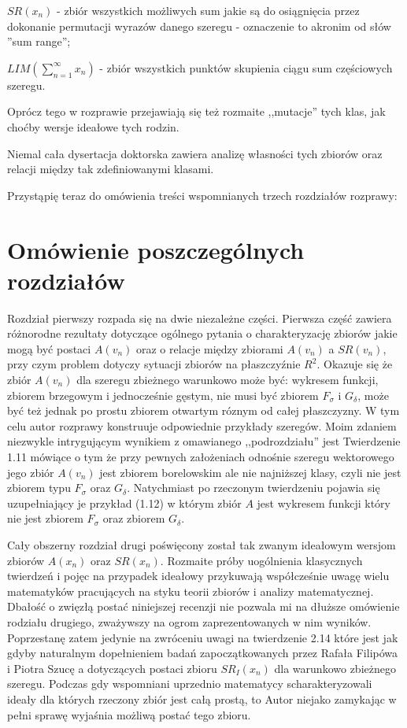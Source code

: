 \documentclass[12pt]{article}
\begin{document}
$SR(x_n)$ - zbiór wszystkich możliwych sum jakie są
do osiągnięcia przez dokonanie permutacji wyrazów
danego szeregu - oznaczenie to akronim od słów 
''sum range'';

$LIM(\sum_{n=1}^\infty x_n)$ - zbiór wszystkich punktów
skupienia ciągu sum częściowych szeregu.

  Oprócz tego w rozprawie przejawiają się też rozmaite ,,mutacje''
tych klas, jak choćby wersje ideałowe tych rodzin.
  
  Niemal cała dysertacja doktorska zawiera analizę
własności tych zbiorów oraz relacji między tak zdefiniowanymi
klasami.
  

  Przystąpię teraz do omówienia treści wspomnianych trzech rozdziałów rozprawy:

\section{Omówienie poszczególnych rozdziałów}

Rozdział pierwszy rozpada się na dwie niezależne części.
Pierwsza część zawiera różnorodne rezultaty dotyczące ogólnego
pytania o charakteryzację zbiorów jakie mogą być postaci $A(v_n)$
oraz o relacje między zbiorami $A(v_n)$ a $SR(v_n)$, przy czym
problem dotyczy sytuacji zbiorów na płaszczyźnie $R^2$.
Okazuje się że zbiór $A(v_n)$ dla szeregu zbieżnego warunkowo 
może być: wykresem funkcji,
zbiorem brzegowym i jednocześnie gęstym, nie musi być zbiorem
$F_\sigma$ i $G_\delta$, może być też jednak po prostu zbiorem
otwartym róznym od całej płaszczyzny. W tym celu autor rozprawy 
konstruuje odpowiednie przykłady szeregów. Moim zdaniem niezwykle
intrygującym wynikiem z omawianego ,,podrozdziału'' jest Twierdzenie
1.11 mówiące o tym że przy pewnych założeniach odnośnie szeregu
wektorowego jego zbiór $A(v_n)$ jest zbiorem borelowskim ale
nie najniższej klasy, czyli nie jest zbiorem typu $F_\sigma$ oraz
$G_\delta$. Natychmiast po rzeczonym twierdzeniu pojawia się uzupełniający
je przykład (1.12) w którym zbiór $A$ jest wykresem funkcji 
który nie jest zbiorem $F_\sigma$ oraz zbiorem $G_\delta$. 
    
  Cały obszerny rozdział drugi poświęcony został 
tak zwanym ideałowym wersjom zbiorów $A(x_n)$ oraz
$SR(x_n)$. Rozmaite próby uogólnienia klasycznych twierdzeń
i pojęc na przypadek ideałowy przykuwają współcześnie
uwagę wielu matematyków pracujących na styku teorii zbiorów 
i analizy matematycznej. Dbałość o zwięzłą postać niniejszej
recenzji nie pozwala mi na dłuższe omówienie rodziału drugiego,
zważywszy na ogrom zaprezentowanych w nim wyników. Poprzestanę zatem
jedynie na zwróceniu uwagi na twierdzenie 2.14 które 
jest jak gdyby naturalnym dopełnieniem badań zapoczątkowanych
przez Rafała Filipówa i Piotra Szucę a dotyczących 
postaci zbioru $SR_I(x_n)$ dla warunkowo zbieżnego szeregu.
Podczas gdy wspomniani uprzednio matematycy scharakteryzowali
ideały dla których rzeczony zbiór jest całą prostą, to
Autor niejako zamykając w pełni sprawę wyjaśnia możliwą
postać tego zbioru.
  
\end{document}
